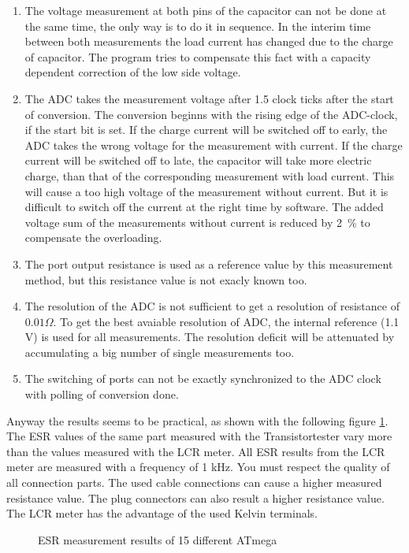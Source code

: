 \begin{enumerate}
\item The voltage measurement at both pins of the capacitor can not be done at the same time, the only way is to do it in sequence.
In the interim time between both measurements the load current has changed due to the charge of capacitor.
The program tries to compensate this fact with a capacity dependent correction of the low side voltage.
\item The ADC takes the measurement voltage after 1.5 clock ticks after the start of conversion.
The conversion beginns with the rising edge of the ADC-clock, if the start bit is set.
If the charge current will be switched off to early, the ADC takes the wrong voltage for the measurement with current.
If the charge current will be switched off to late, the capacitor will take more electric charge, than that of the
corresponding measurement with load current. This will cause a too high voltage of the measurement without current.
But it is difficult to switch off the current at the right time by software. 
The added voltage sum of the measurements without current is reduced by 2~\% to compensate the overloading.
\item The port output resistance is used as a reference value by this measurement method, but this resistance value is
not exacly known too.
\item The resolution of the ADC is not sufficient to get a resolution of resistance of \(0.01 \Omega\).
To get the best avaiable resolution of ADC, the internal reference (1.1 V) is used for all measurements.
The resolution deficit will be attenuated by accumulating a big number of single measurements too.
\item The switching of ports can not be exactly synchronized to the ADC clock with polling of conversion done.
\end{enumerate}

Anyway the results seems to be practical, as shown with the following figure \ref{fig:Cesr}.
The ESR values of the same part measured with the Transistortester vary more than the values measured with the LCR meter.
All ESR results from the LCR meter are measured with a frequency of 1 kHz.
You must respect the quality of all connection parts. The used cable connections can cause a higher measured resistance value.
The plug connectors can also result a higher resistance value.
The LCR meter has the advantage of the used Kelvin terminals.

\begin{figure}[H]
\centering

\caption{ESR measurement results of 15 different ATmega}
\label{fig:Cesr}
\end{figure}




